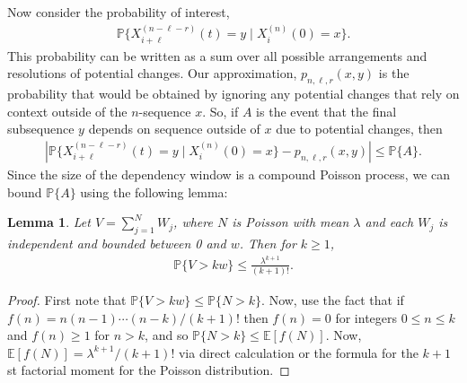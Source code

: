 \documentclass{article}
\newcommand{\E}{\mathbb{E}}
\renewcommand{\P}{\mathbb{P}}
\theoremstyle{plain}
\newtheorem{lemma}{Lemma}
\theoremstyle{definition}
\begin{document}
Now consider the probability of interest,
\begin{align*}
    \P\{ X_{i+\ell}^{(n-\ell-r)}(t) = y \mid X_i^{(n)}(0) = x \} .
\end{align*}
This probability can be written as a sum over all possible arrangements
and resolutions of potential changes.
Our approximation, $p_{n,\ell,r}(x,y)$ is the probability that would be obtained
by ignoring any potential changes that rely on context outside of the $n$-sequence $x$.
So, if $A$ is the event that the final subsequence $y$
depends on sequence outside of $x$ due to potential changes,
then
\begin{align*}
    \left|
        \P\{ X_{i+\ell}^{(n-\ell-r)}(t) = y \mid X_i^{(n)}(0) = x \}
        -
        p_{n,\ell,r}(x,y)
    \right|
    \le \P\{A\} .
\end{align*}
Since the size of the dependency window is a compound Poisson process,
we can bound $\P\{A\}$ using the following lemma:

\begin{lemma}
    Let $V = \sum_{j=1}^N W_j$,
    where $N$ is Poisson with mean $\lambda$
    and each $W_j$ is independent and bounded between 0 and $w$.
    Then for $k \ge 1$,
    \begin{align}
        \P\{ V > k w \}
        \le
        \frac{\lambda^{k+1}}{(k+1)!} .
    \end{align}
\end{lemma}

%

\begin{proof}
    First note that $\P\{V > kw\} \le \P\{N > k\}$.
    Now, use the fact that if $f(n) = n (n-1) \cdots (n-k) / (k+1)!$
    then $f(n) = 0$ for integers $0 \le n \le k$ and $f(n) \ge 1$ for $n > k$,
    and so $\P\{N > k\} \le \E[f(N)]$.
    Now, $\E[f(N)] = \lambda^{k+1} / (k+1)!$ via direct calculation or the
    formula for the $k+1$st factorial moment for the Poisson distribution.
\end{proof}
\end{document}
